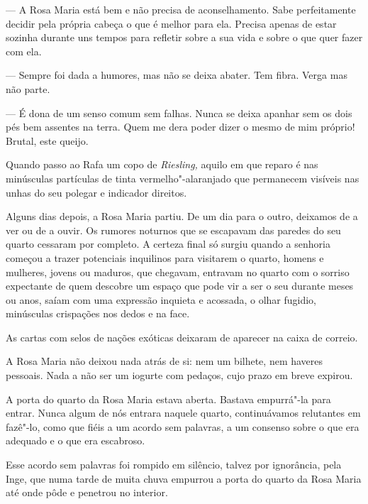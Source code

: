 --- A Rosa Maria está bem e não precisa de aconselhamento. Sabe
  perfeitamente decidir pela própria cabeça o que é melhor para ela.
  Precisa apenas de estar sozinha durante uns tempos para refletir
  sobre a sua vida e sobre o que quer fazer com ela.

--- Sempre foi dada a humores, mas não se deixa abater.
Tem fibra. Verga mas não parte.

--- É dona de um senso comum sem falhas. Nunca se deixa apanhar sem os
  dois pés bem assentes na terra. Quem me dera poder dizer o mesmo de
  mim próprio! Brutal, este queijo.

Quando passo ao Rafa um copo de \emph{Riesling, }aquilo em que reparo é
nas minúsculas partículas de tinta vermelho"-alaranjado que permanecem
visíveis nas unhas do seu polegar e indicador direitos.


\medskip
\asterisc
\medskip

Alguns dias depois, a Rosa Maria partiu. De um dia para o outro,
deixamos de a ver ou de a ouvir. Os rumores noturnos que se escapavam
das paredes do seu quarto cessaram por completo. A certeza final só
surgiu quando a senhoria começou a trazer potenciais inquilinos para
visitarem o quarto, homens e mulheres, jovens ou maduros, que chegavam, entravam no quarto com o
sorriso expectante de quem descobre um espaço que pode vir a ser o seu
durante meses ou anos, saíam com uma expressão inquieta e acossada, o
olhar fugidio, minúsculas crispações nos dedos e na face.

As cartas com selos de nações exóticas deixaram de aparecer na caixa de
correio.

A Rosa Maria não deixou nada atrás de si: nem um bilhete, nem haveres
pessoais. Nada a não ser um iogurte com pedaços, cujo prazo em breve
expirou.

A porta do quarto da Rosa Maria estava aberta. Bastava empurrá"-la para
entrar. Nunca algum de nós entrara naquele quarto, continuávamos
relutantes em fazê"-lo, como que fiéis a um acordo sem palavras, a um
consenso sobre o que era adequado e o que era escabroso.

Esse acordo sem palavras foi rompido em silêncio, talvez por ignorância,
pela Inge, que numa tarde de muita chuva empurrou a porta do quarto da
Rosa Maria até onde pôde e penetrou no interior.


